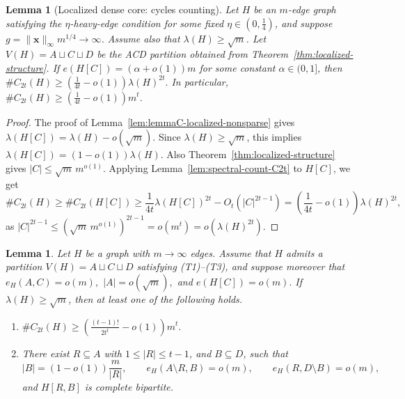\documentclass[10pt,a4paper]{amsart}
\newtheorem{lemma}[theorem]{Lemma}
\begin{document}
\begin{lemma}[Localized dense core:  cycles counting]
\label{lem:cycle-localized-nonsparse}
Let \(H\) be an \(m\)-edge graph satisfying the \(\eta\)-heavy-edge
condition for some fixed \(\eta\in(0,\frac14)\), and suppose
\(g=\|\bm{x}\|_\infty m^{1/4}\to\infty\).  Assume also that
\(\lambda(H)\ge\sqrt m\).  Let
$V(H)=A\sqcup C\sqcup D$
be the ACD partition obtained from Theorem~\ref{thm:localized-structure}.
If $e(H[C])=(\alpha+o(1))m$
for some constant \(\alpha\in(0,1]\), then $\texttt{\#}C_{2t}(H)
        \ge
        \left(\frac{1}{4t}-o(1)\right)\lambda(H)^{2t}.$
In particular, $\texttt{\#}C_{2t}(H)
        \ge
        \left(\frac{1}{4t}-o(1)\right)m^t.$
\end{lemma}

\begin{proof}
The proof of Lemma~\ref{lem:lemmaC-localized-nonsparse} gives $\lambda(H[C])=\lambda(H)-o(\sqrt m).$
Since \(\lambda(H)\ge\sqrt m\), this implies $\lambda(H[C])=(1-o(1))\lambda(H).$
Also Theorem~\ref{thm:localized-structure} gives $|C|\le \sqrt m\,m^{o(1)}.$
Applying Lemma~\ref{lem:spectral-count-C2t} to \(H[C]\), we get
\[
        \texttt{\#}C_{2t}(H)\ge
        \texttt{\#}C_{2t}(H[C])\ge
        \frac{1}{4t}\lambda(H[C])^{2t}
        -
        O_t(|C|^{2t-1})     =
        \left(\frac{1}{4t}-o(1)\right)\lambda(H)^{2t},
\]
as $|C|^{2t-1}
        \le
        \left(\sqrt m\,m^{o(1)}\right)^{2t-1}
        =
        o(m^t)
        =
        o(\lambda(H)^{2t}).$
\end{proof}

\begin{lemma}
\label{lem:cycle-sparseC-rowcover}
Let \(H\) be a graph with \(m\to\infty\) edges.  Assume that \(H\)
admits a partition \(V(H)=A\sqcup C\sqcup D\) satisfying
\textup{(T1)}--\textup{(T3)}, and suppose moreover that $e_H(A,C)=o(m),$ $
        |A|=o(\sqrt m),$ and $        e(H[C])=o(m).$
If \(\lambda(H)\ge\sqrt m\), then at least one of the following holds.
\begin{enumerate}
    \item[\rm(i)] $\texttt{\#}C_{2t}(H)
        \ge
        \left(\frac{(t-1)!}{2t^t}-o(1)\right)m^t.$

    \item[\rm(ii)]
    There exist \(R\subseteq A\) with \(1\le |R|\le t-1\), and
    \(B\subseteq D\), such that
    \[
        |B|=(1-o(1))\frac{m}{|R|},
        \qquad
        e_H(A\setminus R,B)=o(m),
        \qquad
        e_H(R,D\setminus B)=o(m),
    \]
    and \(H[R,B]\) is complete bipartite.
\end{enumerate}
\end{lemma}
\end{document}
